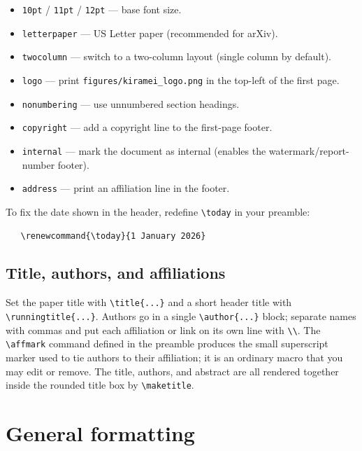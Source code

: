 \documentclass[11pt,letterpaper,twocolumn]{template/style}
\newcommand{\affmark}[1]{%
  \textsuperscript{%
    {\usefont{T1}{pbk}{m}{n}\textcolor{BgPrimary600}{\textbf{#1}}}%
  }%
}
\begin{document}
\begin{itemize}
  \item \verb+10pt+ / \verb+11pt+ / \verb+12pt+ --- base font size.
  \item \verb+letterpaper+ --- US Letter paper (recommended for arXiv).
  \item \verb+twocolumn+ --- switch to a two-column layout (single column by
    default).
  \item \verb+logo+ --- print \verb+figures/kiramei_logo.png+ in the top-left of the
    first page.
  \item \verb+nonumbering+ --- use unnumbered section headings.
  \item \verb+copyright+ --- add a copyright line to the first-page footer.
  \item \verb+internal+ --- mark the document as internal (enables the 
    watermark/report-number footer).
  \item \verb+address+ --- print an affiliation line in the footer.
\end{itemize}

To fix the date shown in the header, redefine \verb+\today+ in your preamble:
\begin{verbatim}
   \renewcommand{\today}{1 January 2026}
\end{verbatim}

\subsection{Title, authors, and affiliations}
\label{sec:title}

Set the paper title with \verb+\title{...}+ and a short header title with
\verb+\runningtitle{...}+. Authors go in a single \verb+\author{...}+ block;
separate names with commas and put each affiliation or link on its own line with
\verb+\\+. The \verb+\affmark+ command defined in the preamble produces the small
superscript marker used to tie authors to their affiliation; it is an
ordinary macro that you may edit or remove. The title, authors, and abstract are
all rendered together inside the rounded title box by \verb+\maketitle+.


\section{General formatting}
\label{sec:format}
\end{document}

